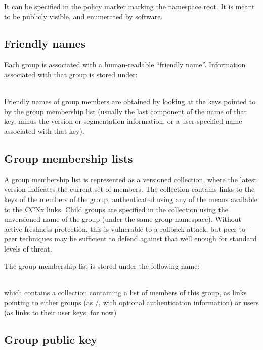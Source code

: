 It can be specified in the policy marker marking the namespace
root. It is meant to be publicly visible, and enumerated by software.


\subsection{Friendly names}

Each group is associated with a human-readable ``friendly
name''. Information associated with that group is stored under:

\\

Friendly names of group members are obtained by looking at the keys
pointed to by the group membership list (usually the last component of
the name of that key, minus the version or segmentation information,
or a user-specified name associated with that key).


\subsection{Group membership lists}

A group membership list is represented as a versioned collection,
where the latest version indicates the current set of members. The
collection contains links to the keys of the members of the group,
authenticated using any of the means available to the CCNx
links. Child groups are specified in the collection using the
unversioned name of the group (under the same group
namespace). Without active freshness protection, this is vulnerable to
a rollback attack, but peer-to-peer techniques may be sufficient to
defend against that well enough for standard levels of threat.

The group membership list is stored under the following name:

\\

which contains a collection containing a list of members of this
group, as links pointing to either groups (as /, with optional
authentication information) or users (as links to their user keys, for
now)


\subsection{Group public key}

